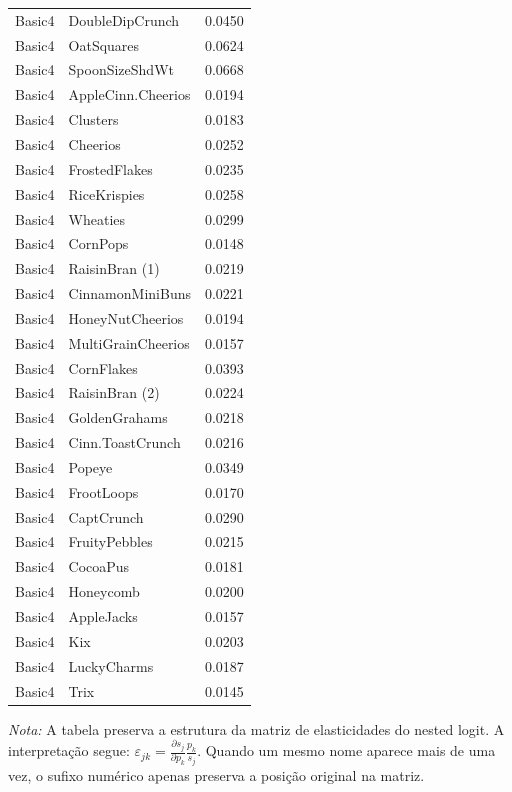 \begin{table}[H]
\begin{tabular}{llr}
Basic4 & DoubleDipCrunch & 0.0450 \\
Basic4 & OatSquares & 0.0624 \\
Basic4 & SpoonSizeShdWt & 0.0668 \\
Basic4 & AppleCinn.Cheerios & 0.0194 \\
Basic4 & Clusters & 0.0183 \\
Basic4 & Cheerios & 0.0252 \\
Basic4 & FrostedFlakes & 0.0235 \\
Basic4 & RiceKrispies & 0.0258 \\
Basic4 & Wheaties & 0.0299 \\
Basic4 & CornPops & 0.0148 \\
Basic4 & RaisinBran (1) & 0.0219 \\
Basic4 & CinnamonMiniBuns & 0.0221 \\
Basic4 & HoneyNutCheerios & 0.0194 \\
Basic4 & MultiGrainCheerios & 0.0157 \\
Basic4 & CornFlakes & 0.0393 \\
Basic4 & RaisinBran (2) & 0.0224 \\
Basic4 & GoldenGrahams & 0.0218 \\
Basic4 & Cinn.ToastCrunch & 0.0216 \\
Basic4 & Popeye & 0.0349 \\
Basic4 & FrootLoops & 0.0170 \\
Basic4 & CaptCrunch & 0.0290 \\
Basic4 & FruityPebbles & 0.0215 \\
Basic4 & CocoaPus & 0.0181 \\
Basic4 & Honeycomb & 0.0200 \\
Basic4 & AppleJacks & 0.0157 \\
Basic4 & Kix & 0.0203 \\
Basic4 & LuckyCharms & 0.0187 \\
Basic4 & Trix & 0.0145 \\
\bottomrule
\end{tabular}

\vspace{0.3em}
\footnotesize
\textit{Nota:} A tabela preserva a estrutura da matriz de elasticidades do nested logit. A interpretação segue: $\varepsilon_{jk}=\frac{\partial s_j}{\partial p_k}\frac{p_k}{s_j}$. Quando um mesmo nome aparece mais de uma vez, o sufixo numérico apenas preserva a posição original na matriz.
\end{table}
\endgroup

